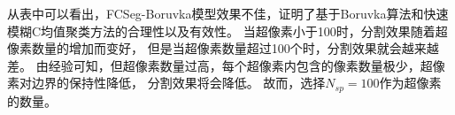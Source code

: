 从表中可以看出，FCSeg-Boruvka模型效果不佳，证明了基于Boruvka算法和快速模糊C均值聚类方法的合理性以及有效性。
当超像素小于100时，分割效果随着超像素数量的增加而变好，
但是当超像素数量超过100个时，分割效果就会越来越差。
由经验可知，但超像素数量过高，每个超像素内包含的像素数量极少，超像素对边界的保持性降低，
分割效果将会降低。
故而，选择$N_{sp}=100$作为超像素的数量。

\begin{figure}[h]
\centering
{}
\end{figure}

